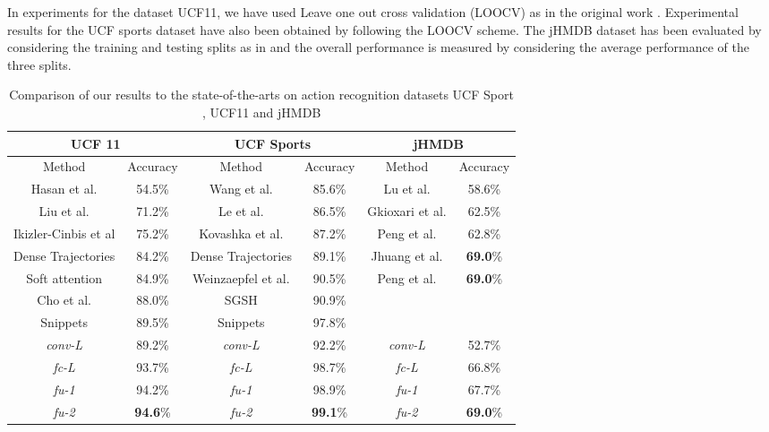 \documentclass[10pt,twocolumn,letterpaper]{article}
\begin{document}
In experiments for the dataset UCF11, we have used Leave one out cross validation (LOOCV) as in the original work \cite{UCF11wild}. Experimental results for the UCF sports dataset have also been obtained by following the LOOCV scheme. The jHMDB dataset has been evaluated by considering the training and testing splits as in \cite{jHMDB2013} and the overall performance is measured by considering the average performance of the three splits.   



\begin{table*}
\begin{center}
\begin{tabular}{|c|c||c|c||c|c|}
 \hline
	
      \multicolumn{2}{|c||}{UCF 11} &
      \multicolumn{2}{c||}{UCF Sports} &
      \multicolumn{2}{c|}{jHMDB} \\
  \hline  
  
       Method & Accuracy & Method & Accuracy & Method & Accuracy  \\
  \hline
	Hasan et al. \cite{Hasan2014} & 54.5\% & Wang et al. \cite{Wang2009} & 85.6\% &  Lu et al. \cite{Lu2015} & 58.6\%  \\	
	Liu et al. \cite{UCF11wild}& 71.2\% & Le et al. \cite{Le2011} & 86.5\% &  Gkioxari et al.\cite{actiontubes}  & 62.5\%\\	
	Ikizler-Cinbis et al \cite{Ikizler-Cinbis2010} & 75.2\% & Kovashka et al. \cite{Kovashka2010} & 87.2\% &  Peng et al. \cite{peng2014}  & 62.8\% \\
	Dense Trajectories \cite{densetrajectories} & 84.2\% & Dense Trajectories  \cite{densetrajectories} & 89.1\% & Jhuang et al. \cite{jHMDB2013} & \textbf{69.0}\% \\
	Soft attention \cite{Sharma2015} &84.9\%  & Weinzaepfel et al. \cite{weinzaepfel2015}& 90.5\% &  Peng et al. \cite{PengX2014}  & \textbf{69.0}\% \\
	Cho et al.\cite{Cho2014} & 88.0\%  & SGSH \cite{Abdulmunem2016}& 90.9\% &  &   \\	
	 Snippets \cite{Ravanbakhsh15} & 89.5\% & Snippets \cite{Ravanbakhsh15} & 97.8\% &   &   \\
\hline
\hline
       \textit{conv-L}  & 89.2\% & \textit{conv-L} & 92.2\%  & \textit{conv-L} & 52.7\%\\	
       \textit{fc-L}  & 93.7\% & \textit{fc-L} & 98.7\%  & \textit{fc-L} & 66.8\%\\	
       \textit{fu-1}  & 94.2\% & \textit{fu-1} & 98.9\%  & \textit{fu-1} & 67.7\%\\	
       \textit{fu-2}  & \textbf{94.6}\% & \textit{fu-2} & \textbf{99.1}\%  & \textit{fu-2} & \textbf{69.0}\%\\	
		

\hline			
			
\end{tabular} %
\end{center}
\vspace{-3 mm}
\caption{Comparison of our results to the state-of-the-arts on action recognition datasets UCF Sport , UCF11 and jHMDB }\label{tab:tab_1}
\end{table*}
\end{document}
